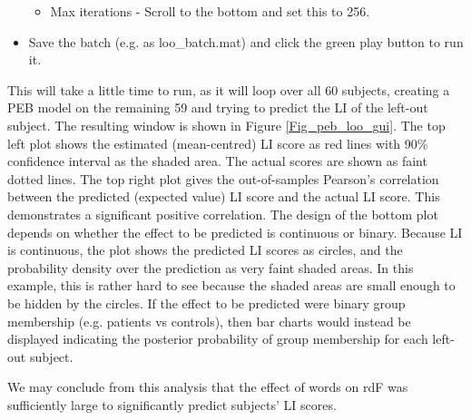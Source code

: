 \documentclass{article}
\begin{document}
\begin{itemize}
\begin{itemize}
        \item Max iterations - Scroll to the bottom and set this to 256.

    \end{itemize}
    
    \item Save the batch (e.g. as loo\_batch.mat) and click the green play button to run it.
    
\end{itemize}

This will take a little time to run, as it will loop over all 60 subjects, creating a PEB model on the remaining 59 and trying to predict the LI of the left-out subject. The resulting window is shown in Figure \ref{Fig_peb_loo_gui}. The top left plot shows the estimated (mean-centred) LI score as red lines with 90\% confidence interval as the shaded area. The actual scores are shown as faint dotted lines. The top right plot gives the out-of-samples Pearson's correlation between the predicted (expected value) LI score and the actual LI score. This demonstrates a significant positive correlation. The design of the bottom plot depends on whether the effect to be predicted is continuous or binary. Because LI is continuous, the plot shows the predicted LI scores as circles, and the probability density over the prediction as very faint shaded areas. In this example, this is rather hard to see because the shaded areas are small enough to be hidden by the circles. If the effect to be predicted were binary group membership (e.g. patients vs controls), then bar charts would instead be displayed indicating the posterior probability of group membership for each left-out subject.

We may conclude from this analysis that the effect of words on rdF was sufficiently large to significantly predict subjects' LI scores.
\end{document}
